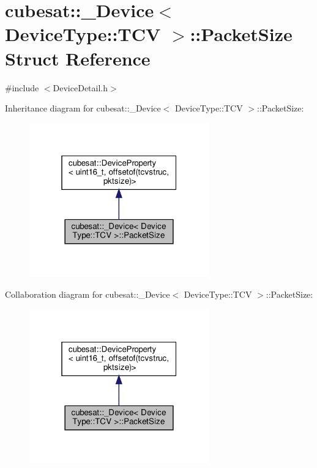 \hypertarget{structcubesat_1_1__Device_3_01DeviceType_1_1TCV_01_4_1_1PacketSize}{}\section{cubesat\+:\+:\+\_\+\+Device$<$ Device\+Type\+:\+:T\+CV $>$\+:\+:Packet\+Size Struct Reference}
\label{structcubesat_1_1__Device_3_01DeviceType_1_1TCV_01_4_1_1PacketSize}


{\ttfamily \#include $<$Device\+Detail.\+h$>$}



Inheritance diagram for cubesat\+:\+:\+\_\+\+Device$<$ Device\+Type\+:\+:T\+CV $>$\+:\+:Packet\+Size\+:\nopagebreak
\begin{figure}[H]
\begin{center}
\leavevmode
\includegraphics[width=220pt]{structcubesat_1_1__Device_3_01DeviceType_1_1TCV_01_4_1_1PacketSize__inherit__graph}
\end{center}
\end{figure}


Collaboration diagram for cubesat\+:\+:\+\_\+\+Device$<$ Device\+Type\+:\+:T\+CV $>$\+:\+:Packet\+Size\+:\nopagebreak
\begin{figure}[H]
\begin{center}
\leavevmode
\includegraphics[width=220pt]{structcubesat_1_1__Device_3_01DeviceType_1_1TCV_01_4_1_1PacketSize__coll__graph}
\end{center}
\end{figure}
